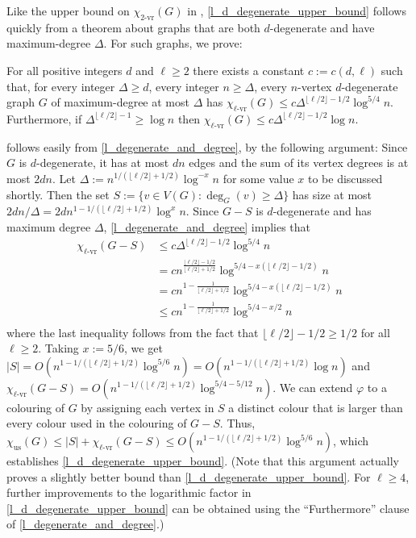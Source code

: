 \documentclass{patmorin}
\newcommand{\rn}[1]{\chi_{\operatorname{#1-vr}}}
\newcommand{\trn}{\chi_{\mathrm{us}}}
\newcommand{\lrn}{\rn{\ell}}
\newcommand{\texp}{1-1/(\lfloor\ell/2\rfloor+1/2)}
\newcommand{\dexp}{1-\frac{1}{\lfloor\ell/2\rfloor+1/2}}
\begin{document}
Like the upper bound on $\rn{2}(G)$ in \cite{karpas.neiman.ea:on}, \cref{l_d_degenerate_upper_bound} follows quickly from a theorem about graphs that are both $d$-degenerate and have maximum-degree $\Delta$. For such graphs, we prove:

\begin{thm}\label{l_degenerate_and_degree}
  For all positive integers $d$ and $\ell\ge 2$ there exists a constant $c:=c(d,\ell)$ such that, for every integer $\Delta\ge d$, every integer $n\ge \Delta$, every $n$-vertex $d$-degenerate graph $G$ of maximum-degree at most $\Delta$ has $\lrn(G)\le c\Delta^{\lfloor\ell/2\rfloor-1/2}\log^{5/4} n$.  Furthermore, if $\Delta^{\lfloor\ell/2\rfloor-1}\ge\log n$ then $\lrn(G)\le c\Delta^{\lfloor\ell/2\rfloor-1/2}\log n$.
\end{thm}

 follows easily from \cref{l_degenerate_and_degree}, by the following argument:  Since $G$ is $d$-degenerate, it has at most $dn$ edges and the sum of its vertex degrees is at most $2dn$.  Let $\Delta:=n^{1/(\lfloor\ell/2\rfloor+1/2)}\log^{-x} n$ for some value $x$ to be discussed shortly.  Then the set $S:=\{v\in V(G):\deg_G(v)\ge \Delta\}$ has size at most $2dn/\Delta=2dn^{\texp}\log^x n$.  Since $G-S$ is $d$-degenerate and has maximum degree $\Delta$, \cref{l_degenerate_and_degree} implies that
\begin{align*}
  \lrn(G-S) &
  \le c\Delta^{\lfloor\ell/2\rfloor-1/2}\log^{5/4} n \\
  & = cn^{\frac{\lfloor\ell/2\rfloor-1/2}{\lfloor\ell/2\rfloor+1/2}}\log^{5/4-x(\lfloor\ell/2\rfloor-1/2)} n \\
  & = cn^{\dexp}\log^{5/4-x(\lfloor\ell/2\rfloor-1/2)} n \\
  & \le cn^{\dexp}\log^{5/4-x/2} n \\
\end{align*}
where the last inequality follows from the fact that $\lfloor\ell/2\rfloor-1/2\ge 1/2$ for all $\ell\ge 2$.  Taking $x:=5/6$, we get $|S|=O(n^{\texp}\log^{5/6} n)=O(n^{\texp}\log n)$ and  $\lrn(G-S)= O(n^{\texp}\log^{5/4-5/12} n)$.  We can extend $\varphi$ to a colouring of $G$ by assigning each vertex in $S$ a distinct colour that is larger than every colour used in the colouring of $G-S$.  Thus, $\trn(G)\le |S|+\lrn(G-S) \le O(n^{\texp}\log^{5/6} n)$, which establishes \cref{l_d_degenerate_upper_bound}.  (Note that this argument actually proves a slightly better bound than \cref{l_d_degenerate_upper_bound}.  For $\ell\ge 4$, further improvements to the logarithmic factor in \cref{l_d_degenerate_upper_bound} can be obtained using the ``Furthermore'' clause of \cref{l_degenerate_and_degree}.)
\end{document}
